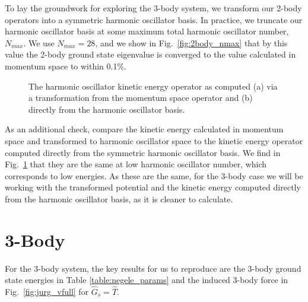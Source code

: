 To lay the groundwork for exploring the 3-body system, we transform our 2-body operators into a symmetric harmonic oscillator basis. In practice, we truncate our harmonic oscillator basis at some maximum total harmonic oscillator number, $N_{max}$. We use $N_{max}=28$, and we show in Fig.~\ref{fig:2body_nmax} that by this value the 2-body ground state eigenvalue is converged to the value calculated in momentum space to within 0.1\%.

\begin{figure}[t]
\begin{center}
\end{center}
\caption{The harmonic oscillator kinetic energy operator as computed (a) via a transformation from the momentum space operator and (b) directly from the harmonic oscillator basis.}
\label{fig:2body_kin_comp}
\end{figure}

As an additional check, compare the kinetic energy calculated in momentum space and transformed to harmonic oscillator space to the kinetic energy operator computed directly from the symmetric harmonic oscillator basis. We find in Fig.~\ref{fig:2body_kin_comp} that they are the same at low harmonic oscillator number, which corresponds to low energies. As these are the same, for the 3-body case we will be working with the transformed potential and the kinetic energy computed directly from the harmonic oscillator basis, as it is cleaner to calculate.%

\section{3-Body}

For the 3-body system, the key results for us to reproduce are the 3-body ground state energies in Table \ref{table:negele_params} and the induced 3-body force in Fig.~\ref{fig:jurg_vfull} for $\hat{G}_s=\hat{T}$.

